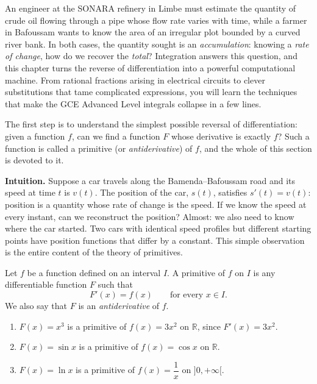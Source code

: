 \documentclass[11pt]{article}
\newcommand{\cle}[1]{{\popxbold\color{popdark}#1}}
\newcounter{popsec}
\newcounter{popsub}
\newcommand{\courssub}[1]{%
  \stepcounter{popsub}%
  \par\vspace{9pt}\noindent{\popxbold\fontsize{11.5}{13}\selectfont\color{popink}{\color{poporange}\thepopsec.\thepopsub}\hspace{6pt}#1}\par\nopagebreak\vspace{4pt}
}
\begin{document}
An engineer at the SONARA refinery in Limbe must estimate the quantity of crude oil flowing through a pipe whose flow rate varies with time, while a farmer in Bafoussam wants to know the area of an irregular plot bounded by a curved river bank. In both cases, the quantity sought is an \emph{accumulation}: knowing a \emph{rate of change}, how do we recover the \emph{total}? Integration answers this question, and this chapter turns the reverse of differentiation into a powerful computational machine. From rational fractions arising in electrical circuits to clever substitutions that tame complicated expressions, you will learn the techniques that make the GCE Advanced Level integrals collapse in a few lines.

The first step is to understand the simplest possible reversal of differentiation: given a function $f$, can we find a function $F$ whose derivative is exactly $f$? Such a function is called a \cle{primitive} (or \emph{antiderivative}) of $f$, and the whole of this section is devoted to it.

\courssub{The notion of a primitive}

\textbf{Intuition.} Suppose a car travels along the Bamenda--Bafoussam road and its speed at time $t$ is $v(t)$. The position of the car, $s(t)$, satisfies $s'(t) = v(t)$: position is a quantity whose rate of change is the speed. If we know the speed at every instant, can we reconstruct the position? Almost: we also need to know where the car started. Two cars with identical speed profiles but different starting points have position functions that differ by a constant. This simple observation is the entire content of the theory of primitives.

\begin{definition}
Let $f$ be a function defined on an interval $I$. A \cle{primitive} of $f$ on $I$ is any differentiable function $F$ such that
\[
F'(x) = f(x) \qquad \text{for every } x \in I.
\]
We also say that $F$ is an \emph{antiderivative} of $f$.
\end{definition}

\begin{exemplebox}
\begin{enumerate}
\item $F(x) = x^3$ is a primitive of $f(x) = 3x^2$ on $\mathbb{R}$, since $F'(x) = 3x^2$.
\item $F(x) = \sin x$ is a primitive of $f(x) = \cos x$ on $\mathbb{R}$.
\item $F(x) = \ln x$ is a primitive of $f(x) = \dfrac{1}{x}$ on $]0, +\infty[$.
\end{enumerate}
\end{exemplebox}
\end{document}
